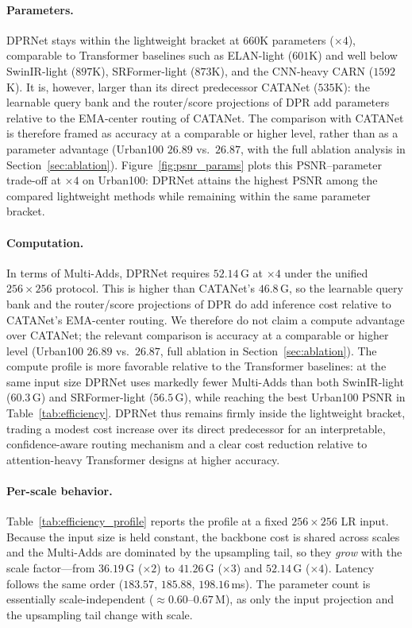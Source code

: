 \paragraph{Parameters.}
DPRNet stays within the lightweight bracket at $660$K parameters ($\times4$),
comparable to Transformer baselines such as ELAN-light ($601$K) and well below
SwinIR-light ($897$K), SRFormer-light ($873$K), and the CNN-heavy CARN
($1592$K). It is, however, larger than its direct predecessor CATANet ($535$K):
the learnable query bank and the router/score projections of DPR add parameters
relative to the EMA-center routing of CATANet. The comparison with CATANet is
therefore framed as accuracy at a comparable or higher level, rather than as a
parameter advantage (Urban100 $26.89$ vs.\ $26.87$, with the full ablation analysis in
Section~\ref{sec:ablation}). Figure~\ref{fig:psnr_params} plots this PSNR--parameter
trade-off at $\times4$ on Urban100: DPRNet attains the highest PSNR among the
compared lightweight methods while remaining within the same parameter bracket.

\paragraph{Computation.}
In terms of Multi-Adds, DPRNet requires $52.14$\,G at $\times4$ under the unified
$256{\times}256$ protocol. This is higher than CATANet's $46.8$\,G, so the learnable
query bank and the router/score projections of DPR do add inference cost relative to
CATANet's EMA-center routing. We therefore do not claim a compute advantage over CATANet;
the relevant comparison is accuracy at a comparable or higher level (Urban100
$26.89$ vs.\ $26.87$, full ablation in Section~\ref{sec:ablation}). The compute profile
is more favorable relative to the Transformer baselines: at the same input size
DPRNet uses markedly fewer Multi-Adds than both SwinIR-light ($60.3$\,G) and
SRFormer-light ($56.5$\,G), while reaching the best Urban100 PSNR in
Table~\ref{tab:efficiency}. DPRNet thus remains firmly inside the lightweight
bracket, trading a modest cost increase over its direct predecessor for an
interpretable, confidence-aware routing mechanism and a clear cost reduction
relative to attention-heavy Transformer designs at higher accuracy.

\paragraph{Per-scale behavior.}
Table~\ref{tab:efficiency_profile} reports the profile at a fixed $256{\times}256$ LR
input. Because the input size is held constant, the backbone cost is shared across scales
and the Multi-Adds are dominated by the upsampling tail, so they \emph{grow} with the scale
factor---from $36.19$\,G ($\times2$) to $41.26$\,G ($\times3$) and $52.14$\,G
($\times4$). Latency follows the same order ($183.57$, $185.88$, $198.16$\,ms). The
parameter count is essentially scale-independent ($\approx0.60$--$0.67$\,M), as only the
input projection and the upsampling tail change with scale.

